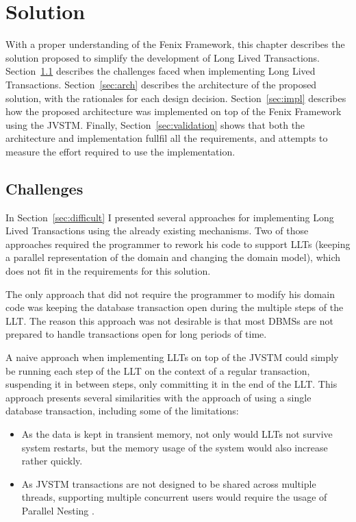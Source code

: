 \chapter{Solution}
\label{chap:solution}

With a proper understanding of the Fenix Framework, this chapter
describes the solution proposed to simplify the development of Long
Lived Transactions. Section~\ref{sec:challenges} describes the
challenges faced when implementing Long Lived
Transactions. Section~\ref{sec:arch} describes the architecture of the
proposed solution, with the rationales for each design
decision. Section~\ref{sec:impl} describes how the proposed
architecture was implemented on top of the Fenix Framework using the
JVSTM. Finally, Section~\ref{sec:validation} shows that both the
architecture and implementation fullfil all the requirements, and
attempts to measure the effort required to use the implementation.

\section{Challenges}
\label{sec:challenges}

In Section~\ref{sec:difficult} I presented several approaches for
implementing Long Lived Transactions using the already existing
mechanisms. Two of those approaches required the programmer to rework
his code to support LLTs (keeping a parallel representation of the
domain and changing the domain model), which does not fit in the
requirements for this solution.

The only approach that did not require the programmer to modify his
domain code was keeping the database transaction open during the
multiple steps of the LLT. The reason this approach was not desirable
is that most DBMSs are not prepared to handle transactions open for
long periods of time.

A naive approach when implementing LLTs on top of the JVSTM could
simply be running each step of the LLT on the context of a regular
transaction, suspending it in between steps, only committing it in the
end of the LLT. This approach presents several similarities with the
approach of using a single database transaction, including some of the
limitations:

\begin{itemize}

\item As the data is kept in transient memory, not only would LLTs not
  survive system restarts, but the memory usage of the system would
  also increase rather quickly.

\item As JVSTM transactions are not designed to be shared across
  multiple threads, supporting multiple concurrent users would
  require the usage of Parallel Nesting
  \cite{NunoMiguelLourencoDiegues2012}.

\end{itemize}

